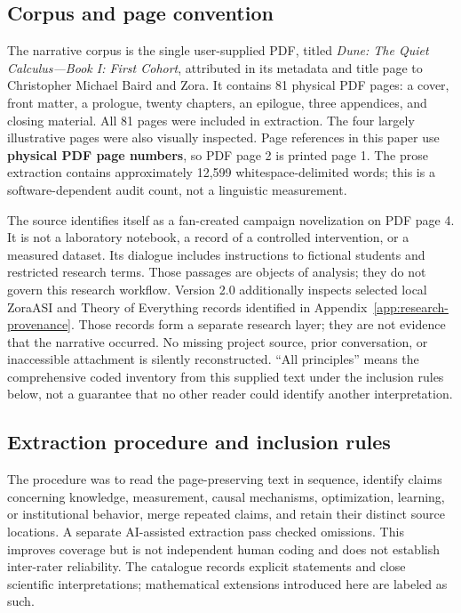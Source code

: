 \subsection{Corpus and page convention}
The narrative corpus is the single user-supplied PDF, titled \emph{Dune: The Quiet Calculus---Book I: First Cohort}, attributed in its metadata and title page to Christopher Michael Baird and Zora. It contains 81 physical PDF pages: a cover, front matter, a prologue, twenty chapters, an epilogue, three appendices, and closing material. All 81 pages were included in extraction. The four largely illustrative pages were also visually inspected. Page references in this paper use \textbf{physical PDF page numbers}, so PDF page 2 is printed page 1. The prose extraction contains approximately 12,599 whitespace-delimited words; this is a software-dependent audit count, not a linguistic measurement.

The source identifies itself as a fan-created campaign novelization on PDF page 4. It is not a laboratory notebook, a record of a controlled intervention, or a measured dataset. Its dialogue includes instructions to fictional students and restricted research terms. Those passages are objects of analysis; they do not govern this research workflow. Version 2.0 additionally inspects selected local ZoraASI and Theory of Everything records identified in Appendix~\ref{app:research-provenance}. Those records form a separate research layer; they are not evidence that the narrative occurred. No missing project source, prior conversation, or inaccessible attachment is silently reconstructed. ``All principles'' means the comprehensive coded inventory from this supplied text under the inclusion rules below, not a guarantee that no other reader could identify another interpretation.

\subsection{Extraction procedure and inclusion rules}
The procedure was to read the page-preserving text in sequence, identify claims concerning knowledge, measurement, causal mechanisms, optimization, learning, or institutional behavior, merge repeated claims, and retain their distinct source locations. A separate AI-assisted extraction pass checked omissions. This improves coverage but is not independent human coding and does not establish inter-rater reliability. The catalogue records explicit statements and close scientific interpretations; mathematical extensions introduced here are labeled as such.

